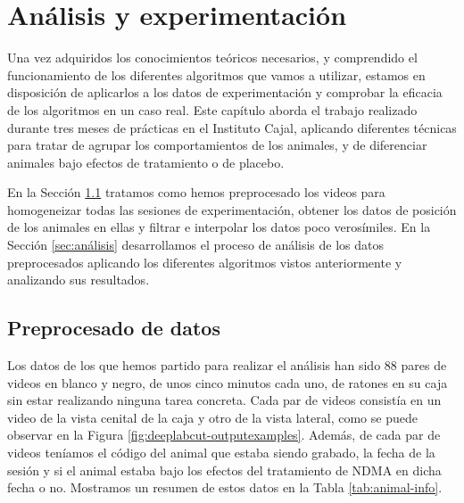 \chapter{Análisis y experimentación} \label{chap:analisis-y-experimentacion}

Una vez adquiridos los conocimientos teóricos necesarios, y comprendido el funcionamiento de los diferentes algoritmos que vamos a utilizar, estamos en disposición de aplicarlos a los datos de experimentación y comprobar la eficacia de los algoritmos en un caso real. Este capítulo aborda el trabajo realizado durante tres meses de prácticas en el Instituto Cajal, aplicando diferentes técnicas para tratar de agrupar los comportamientos de los animales, y de diferenciar animales bajo efectos de tratamiento o de placebo.

En la Sección \ref{sec:preprocesado} tratamos como hemos preprocesado los videos para homogeneizar todas las sesiones de experimentación, obtener los datos de posición de los animales en ellas y filtrar e interpolar los datos poco verosímiles. En la Sección \ref{sec:análisis} desarrollamos el proceso de análisis de los datos preprocesados aplicando los diferentes algoritmos vistos anteriormente y analizando sus resultados.

\section{Preprocesado de datos} \label{sec:preprocesado}

Los datos de los que hemos partido para realizar el análisis han sido 88 pares de videos en blanco y negro, de unos cinco minutos cada uno, de ratones en su caja sin estar realizando ninguna tarea concreta. Cada par de videos consistía en un video de la vista cenital de la caja y otro de la vista lateral, como se puede observar en la Figura \ref{fig:deeplabcut-outputexamples}. Además, de cada par de videos teníamos el código del animal que estaba siendo grabado, la fecha de la sesión y si el animal estaba bajo los efectos del tratamiento de NDMA en dicha fecha o no. Mostramos un resumen de estos datos en la Tabla \ref{tab:animal-info}.


